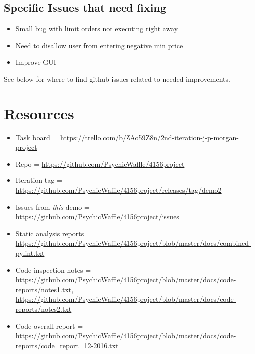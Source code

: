 \documentclass{article}
\begin{document}
\subsection{Specific Issues that need fixing}
\begin{itemize}
\item Small bug with limit orders not executing right away
\item Need to disallow user from entering negative min price
\item Improve GUI
\end{itemize}
See below for where to find github issues related to needed improvements.

\section{Resources}
\begin{itemize}
\item Task board = \url{https://trello.com/b/ZAo59Z8n/2nd-iteration-j-p-morgan-project}
\item Repo = \url{https://github.com/PsychicWaffle/4156project}
\item Iteration tag = \url{https://github.com/PsychicWaffle/4156project/releases/tag/demo2}
\item Issues from \emph{this} demo = \url{https://github.com/PsychicWaffle/4156project/issues}
\item Static analysis reports = \url{https://github.com/PsychicWaffle/4156project/blob/master/docs/combined-pylint.txt}
\item Code inspection notes = \url{https://github.com/PsychicWaffle/4156project/blob/master/docs/code-reports/notes1.txt}, \url{https://github.com/PsychicWaffle/4156project/blob/master/docs/code-reports/notes2.txt}

\item Code overall report = \url{https://github.com/PsychicWaffle/4156project/blob/master/docs/code-reports/code_report_12-2016.txt}
\end{itemize}
\end{document}
